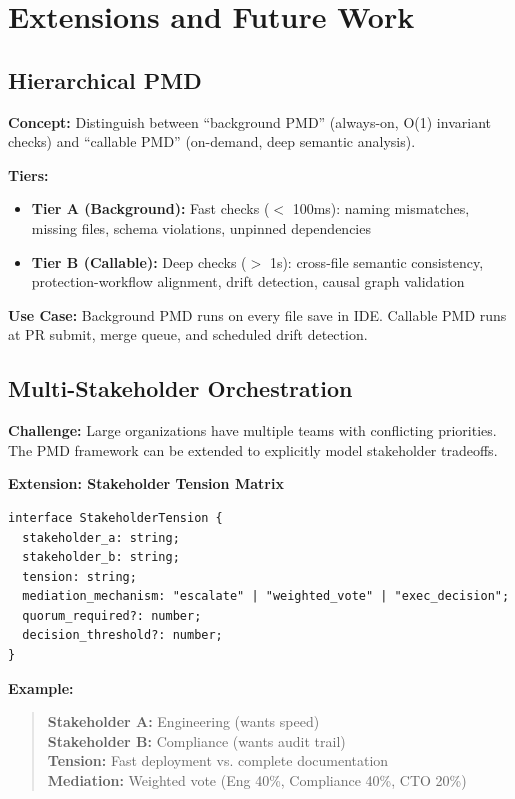 \documentclass[11pt,a4paper]{article}
\begin{document}
\section{Extensions and Future Work}

\subsection{Hierarchical PMD}

\textbf{Concept:} Distinguish between ``background PMD'' (always-on, O(1) invariant checks) and ``callable PMD'' (on-demand, deep semantic analysis).

\textbf{Tiers:}
\begin{itemize}
\item \textbf{Tier A (Background):} Fast checks ($<$ 100ms): naming mismatches, missing files, schema violations, unpinned dependencies
\item \textbf{Tier B (Callable):} Deep checks ($>$ 1s): cross-file semantic consistency, protection-workflow alignment, drift detection, causal graph validation
\end{itemize}

\textbf{Use Case:} Background PMD runs on every file save in IDE. Callable PMD runs at PR submit, merge queue, and scheduled drift detection.

\subsection{Multi-Stakeholder Orchestration}

\textbf{Challenge:} Large organizations have multiple teams with conflicting priorities. The PMD framework can be extended to explicitly model stakeholder tradeoffs.

\textbf{Extension: Stakeholder Tension Matrix}

\begin{verbatim}
interface StakeholderTension {
  stakeholder_a: string;
  stakeholder_b: string;
  tension: string;
  mediation_mechanism: "escalate" | "weighted_vote" | "exec_decision";
  quorum_required?: number;
  decision_threshold?: number;
}
\end{verbatim}

\textbf{Example:}
\begin{quote}
\textbf{Stakeholder A:} Engineering (wants speed) \\
\textbf{Stakeholder B:} Compliance (wants audit trail) \\
\textbf{Tension:} Fast deployment vs. complete documentation \\
\textbf{Mediation:} Weighted vote (Eng 40\%, Compliance 40\%, CTO 20\%)
\end{quote}
\end{document}

